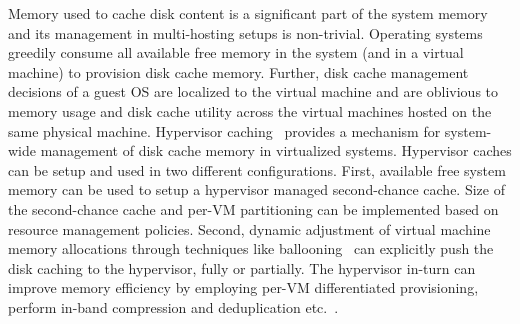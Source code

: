 %
Memory used to cache disk content is a significant part of the 
system memory and its management in multi-hosting setups is
non-trivial.  
%
%
Operating systems greedily consume
all available free memory in the system (and in a virtual machine)
to provision disk cache memory.
%
Further, disk cache management decisions of a guest OS are 
localized to the virtual machine and are oblivious to memory 
usage and disk cache utility 
across the virtual machines hosted on the same physical machine.
%
%
Hypervisor caching~\cite{memtrans, oracletmem, kvmzcache, vmmexclusive, singleton} 
provides a mechanism for system-wide management of %
disk cache memory in virtualized systems. 
%
Hypervisor caches can be setup and used 
in two different configurations.
%
First, available free system memory can be used to setup a 
hypervisor managed second-chance cache.
%
Size of the second-chance cache and per-VM partitioning 
can be implemented based on resource management policies.
%
Second, dynamic adjustment of virtual machine memory allocations through
techniques like ballooning~\cite{vmware,hotplug} can explicitly
push the disk caching to the hypervisor, fully or partially.
%
%
The hypervisor in-turn can improve
memory efficiency by employing per-VM differentiated provisioning,
perform in-band compression and deduplication etc.~\cite{oracletmem,kvmzcache}.
%

